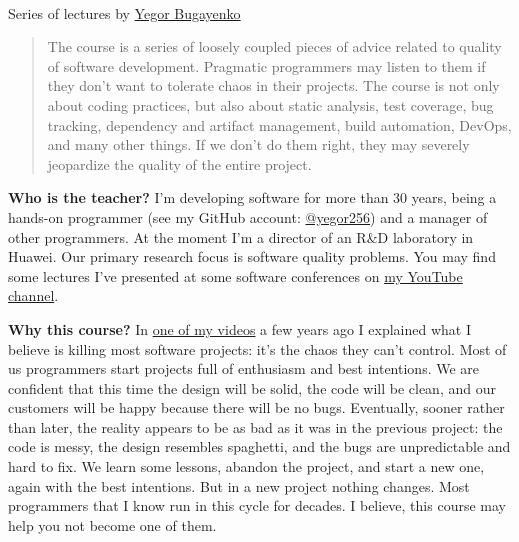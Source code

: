 \documentclass[nobrand,anonymous,nodate,nosecurity]{huawei}
\begin{document}
{\\
Series of lectures by \href{https://www.yegor256.com}{Yegor Bugayenko}\\


\begin{abstract}
The course is a series of loosely coupled pieces of advice related to quality of software development.
Pragmatic programmers may listen to them if they don't want
to tolerate chaos in their projects. The course is not only about
coding practices, but also about static analysis, test coverage,
bug tracking, dependency and artifact management, build automation,
DevOps, and many other things. If we don't do them right, they may
severely jeopardize the quality of the entire project.
\end{abstract}


\textbf{Who is the teacher?}
I'm developing software for more than 30 years, being a hands-on programmer
(see my GitHub account: \href{https://github.com/yegor256}{@yegor256})
and a manager of other programmers. At the moment I'm a director
of an R\&D laboratory in Huawei. Our primary research focus is
software quality problems. You may find some lectures I've presented
at some software conferences on
\href{https://www.youtube.com/channel/UCr9qCdqXLm2SU0BIs6d_68Q}{my YouTube channel}.

\textbf{Why this course?}
In \href{https://www.youtube.com/watch?v=kPmbRkSWYnY}{one of my videos}
a few years ago I explained what I believe is killing
most software projects: it's the chaos they can't control. Most of us
programmers start projects full of enthusiasm and best intentions.
We are confident that this time the design will be solid, the code will
be clean, and our customers will be happy because there will be no bugs.
Eventually, sooner rather than later, the reality appears to be as bad
as it was in the previous project: the code is messy, the design resembles
spaghetti, and the bugs are unpredictable and hard to fix. We learn some
lessons, abandon the project, and start a new one, again with the best
intentions. But in a new project nothing changes.
Most programmers that I know run in this cycle for decades.
I believe, this course may help you not become one of them.

}
\end{document}
